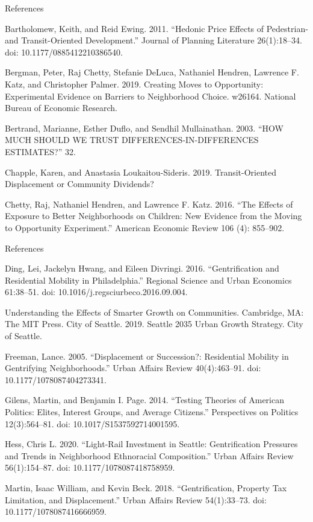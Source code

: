 \documentclass[11pt,ignorenonframetext,]{beamer}
\begin{document}
\begin{frame}{References}
\protect\hypertarget{references}{}

\fontsize{7pt}{7.2}\selectfont

Bartholomew, Keith, and Reid Ewing. 2011. ``Hedonic Price Effects of
Pedestrian- and Transit-Oriented Development.'' Journal of Planning
Literature 26(1):18--34. doi: 10.1177/0885412210386540.

Bergman, Peter, Raj Chetty, Stefanie DeLuca, Nathaniel Hendren, Lawrence
F. Katz, and Christopher Palmer. 2019. Creating Moves to Opportunity:
Experimental Evidence on Barriers to Neighborhood Choice. w26164.
National Bureau of Economic Research.

Bertrand, Marianne, Esther Duﬂo, and Sendhil Mullainathan. 2003. ``HOW
MUCH SHOULD WE TRUST DIFFERENCES-IN-DIFFERENCES ESTIMATES?'' 32.

Chapple, Karen, and Anastasia Loukaitou-Sideris. 2019. Transit-Oriented
Displacement or Community Dividends?

Chetty, Raj, Nathaniel Hendren, and Lawrence F. Katz. 2016. ``The
Effects of Exposure to Better Neighborhoods on Children: New Evidence
from the Moving to Opportunity Experiment.'' American Economic Review
106 (4): 855--902.

\end{frame}

\begin{frame}{References}
\protect\hypertarget{references-1}{}

\fontsize{7pt}{7.2}\selectfont

Ding, Lei, Jackelyn Hwang, and Eileen Divringi. 2016. ``Gentrification
and Residential Mobility in Philadelphia.'' Regional Science and Urban
Economics 61:38--51. doi: 10.1016/j.regsciurbeco.2016.09.004.

Understanding the Effects of Smarter Growth on Communities. Cambridge,
MA: The MIT Press. City of Seattle. 2019. Seattle 2035 Urban Growth
Strategy. City of Seattle.

Freeman, Lance. 2005. ``Displacement or Succession?: Residential
Mobility in Gentrifying Neighborhoods.'' Urban Affairs Review
40(4):463--91. doi: 10.1177/1078087404273341.

Gilens, Martin, and Benjamin I. Page. 2014. ``Testing Theories of
American Politics: Elites, Interest Groups, and Average Citizens.''
Perspectives on Politics 12(3):564--81. doi: 10.1017/S1537592714001595.

Hess, Chris L. 2020. ``Light-Rail Investment in Seattle: Gentrification
Pressures and Trends in Neighborhood Ethnoracial Composition.'' Urban
Affairs Review 56(1):154--87. doi: 10.1177/1078087418758959.

Martin, Isaac William, and Kevin Beck. 2018. ``Gentrification, Property
Tax Limitation, and Displacement.'' Urban Affairs Review 54(1):33--73.
doi: 10.1177/1078087416666959.

\end{frame}
\end{document}
